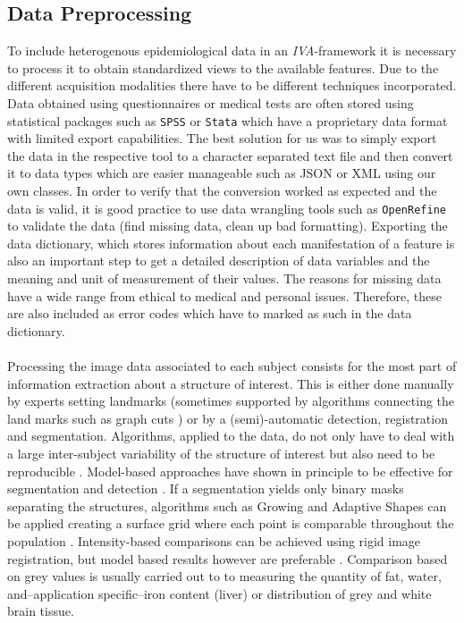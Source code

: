 \documentclass[journal]{style/vgtc} 			          %
\begin{document}
\subsection{Data Preprocessing}
To include heterogenous epidemiological data in an \emph{IVA}-framework it is necessary to process it to obtain standardized views to the available features.
%
Due to the different acquisition modalities there have to be different techniques incorporated.
%
Data obtained using questionnaires or medical tests are often stored using statistical packages such as \texttt{SPSS} or \texttt{Stata} which have a proprietary data format with limited export capabilities.
%
The best solution for us was to simply export the data in the respective tool to a character separated text file and then convert it to data types which are easier manageable such as JSON or XML using our own classes.
%
In order to verify that the conversion worked as expected and the data is valid, it is good practice to use data wrangling tools such as \texttt{OpenRefine} to validate the data (find missing data, clean up bad formatting).
%
Exporting the data dictionary, which stores information about each manifestation of a feature is also an important step to get a detailed description of data variables and the meaning and unit of measurement of their values.
%
The reasons for missing data have a wide range from ethical to medical and personal issues.
%
Therefore, these are also included as error codes which have to marked as such in the data dictionary.
\\\\
Processing the image data associated to each subject consists for the most part of information extraction about a structure of interest.
%
This is either done manually by experts setting landmarks (sometimes supported by algorithms connecting the land marks such as graph cuts \cite{GraphCut}) or by a (semi)-automatic detection, registration and segmentation.
%
Algorithms, applied to the data, do not only have to deal with a large inter-subject variability of the structure of interest but also need to be reproducible \cite{Preim2014}.
%
Model-based approaches have shown in principle to be effective for segmentation \cite{Gloger2010, Gloger2012} and detection \cite{Rak2013}.
%
If a segmentation yields only binary masks separating the structures, algorithms such as Growing and Adaptive Shapes can be applied creating a surface grid where each point is comparable throughout the population \cite{Ferrarini2007}.
%
Intensity-based comparisons can be achieved using rigid image registration, but model based results however are preferable \cite{Klemm2012}.
%
Comparison based on grey values is usually carried out to to measuring the quantity of fat, water, and--application specific--iron content (liver) or distribution of grey and white brain tissue.
\end{document}

